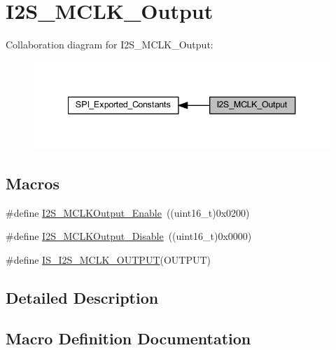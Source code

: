 \hypertarget{group___i2_s___m_c_l_k___output}{}\section{I2\+S\+\_\+\+M\+C\+L\+K\+\_\+\+Output}
\label{group___i2_s___m_c_l_k___output}
Collaboration diagram for I2\+S\+\_\+\+M\+C\+L\+K\+\_\+\+Output\+:
\nopagebreak
\begin{figure}[H]
\begin{center}
\leavevmode
\includegraphics[width=340pt]{group___i2_s___m_c_l_k___output}
\end{center}
\end{figure}
\subsection*{Macros}
\begin{DoxyCompactItemize}
\item 
\#define \hyperlink{group___i2_s___m_c_l_k___output_ga99713ee8c824f4d3bb25a9ce7bf5312a}{I2\+S\+\_\+\+M\+C\+L\+K\+Output\+\_\+\+Enable}~((uint16\+\_\+t)0x0200)
\item 
\#define \hyperlink{group___i2_s___m_c_l_k___output_gaea09824d7e6359924152277ed3661e7e}{I2\+S\+\_\+\+M\+C\+L\+K\+Output\+\_\+\+Disable}~((uint16\+\_\+t)0x0000)
\item 
\#define \hyperlink{group___i2_s___m_c_l_k___output_ga829ae526d1d11f14592e881f800fbb8a}{I\+S\+\_\+\+I2\+S\+\_\+\+M\+C\+L\+K\+\_\+\+O\+U\+T\+P\+UT}(O\+U\+T\+P\+UT)
\end{DoxyCompactItemize}


\subsection{Detailed Description}


\subsection{Macro Definition Documentation}
\mbox{\label{group___i2_s___m_c_l_k___output_gaea09824d7e6359924152277ed3661e7e}} 
